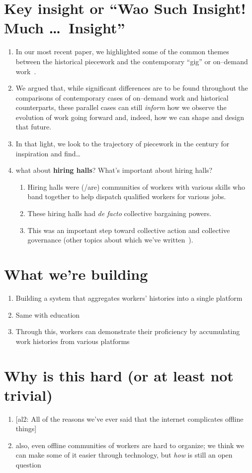 \documentclass[10pt]{article}
\newcommand{\ali}[1]{{\color{Red}[al2: #1]}}
\newcommand{\joke}[1]{{\color{JokeGreen}#1}} %
\begin{document}
\section*{Key insight \joke{or ``Wao Such Insight! Much \dots~Insight''}}
\begin{enumerate}[noitemsep]
  \item In our most recent paper, we highlighted some of the common themes between
        the historical piecework and the contemporary ``gig'' or
        on--demand work~\cite{pieceworkCrowdworkGigwork}.
  \item We argued that, while significant differences are to be found throughout the comparisons of
        contemporary cases of on--demand work and historical counterparts,
        these parallel cases can still \textit{inform} how we observe the evolution of work going forward
        and, indeed, how we can shape and design that future.
  \item In that light, we look to the trajectory of piecework in the  century for inspiration and find\dots
  \item what about \textbf{hiring halls}? What's important about hiring halls?
  \begin{enumerate}[noitemsep]
    \item Hiring halls were (/are) communities of workers with various skills who band together
          to help dispatch qualified workers for various jobs.
    \item These hiring halls had \textit{de facto} collective bargaining powers.
    \item This was an important step toward collective action and collective governance
          (other topics about which we've written~\cite{dynamo}).
  \end{enumerate}
\end{enumerate}

\section*{What we're building}
\begin{enumerate}[noitemsep]
  \item Building a system that aggregates workers' histories into a single platform
  \item Same with education
  \item Through this, workers can demonstrate their proficiency by accumulating work histories from various platforms
\end{enumerate}

\section*{Why is this hard (or at least not trivial)}
\begin{enumerate}
  \item \ali{All of the reasons we've ever said that the internet complicates offline things}
  \item also, even offline communities of workers are hard to organize;
        we think we can make some of it easier through technology, but \textit{how} is still an open question
\end{enumerate}


\printbibliography{}
\end{document}
